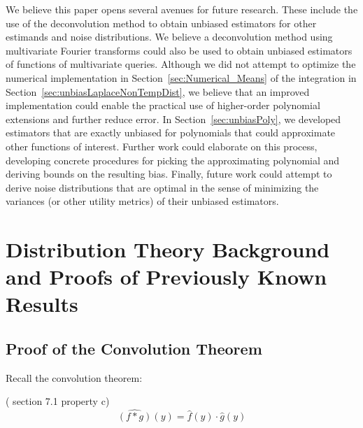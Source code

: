 \documentclass[11pt]{article}
\begin{document}
We believe this paper opens several avenues for future research. These include the use of the deconvolution method to obtain unbiased estimators for other estimands and noise distributions. We believe a deconvolution method using multivariate Fourier transforms could also be used to obtain unbiased estimators of functions of multivariate queries. Although we did not attempt to optimize the numerical implementation in Section~\ref{sec:Numerical_Means} of the integration in Section~\ref{sec:unbiasLaplaceNonTempDist}, we believe that an improved implementation could enable the practical use of higher-order polynomial extensions and further reduce error. In Section~\ref{sec:unbiasPoly}, we developed estimators that are exactly unbiased for polynomials that could approximate other functions of interest. Further work could elaborate on this process, developing concrete procedures for picking the approximating polynomial and deriving bounds on the resulting bias. Finally, future work could attempt to derive noise distributions that are optimal in the sense of minimizing the variances (or other utility metrics) of their unbiased estimators.

\appendix

\section{Distribution Theory Background and Proofs of Previously Known Results \label{app:Prelim}}


\subsection{Proof of the Convolution Theorem}
Recall the convolution theorem:
\begin{theorem}
    (\cite{vanDijk+2013} section 7.1 property c)
    $$\widehat{(f*g)}(y) = \hat{f}(y) \cdot \hat{g}(y)$$
\end{theorem}
\end{document}

